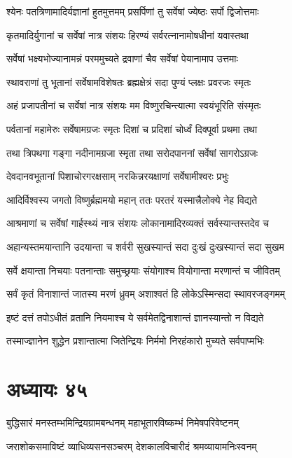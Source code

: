 \twolineshloka
{श्येनः पतत्रिणामादिर्यज्ञानां हुतमुत्तमम्}
{प्रसर्पिणां तु सर्वेषां ज्येष्ठः सर्पो द्विजोत्तमाः}


\twolineshloka
{कृतमादिर्युगानां च सर्वेषां नात्र संशयः}
{हिरण्यं सर्वरत्नानामोषधीनां यवास्तथा}


\twolineshloka
{सर्वेषां भक्ष्यभोज्यानामन्नं परममुच्यते}
{द्रवाणां चैव सर्वेषां पेयानामाप उत्तमाः}


\twolineshloka
{स्थावराणां तु भूतानां सर्वेषामविशेषतः}
{ब्रह्मक्षेत्रं सदा पुण्यं प्लक्षः प्रवरजः स्मृतः}


\twolineshloka
{अहं प्रजापतीनां च सर्वेषां नात्र संशयः}
{मम विष्णुरचिन्त्यात्मा स्वयंभूरिति संस्मृतः}


\twolineshloka
{पर्वतानां महामेरुः सर्वेषामग्रजः स्मृतः}
{दिशां च प्रदिशां चोर्ध्वं दिक्पूर्वा प्रथमा तथा}


\twolineshloka
{तथा त्रिपथगा गङ्गा नदीनामग्रजा स्मृता}
{तथा सरोदपाननां सर्वेषां सागरोऽग्रजः}


\twolineshloka
{देवदानवभूतानां पिशाचोरगरक्षसाम्}
{नरकिन्नरयक्षाणां सर्वेषामीश्वरः प्रभुः}


\twolineshloka
{आदिर्विश्वस्य जगतो विष्णुर्ब्रह्ममयो महान्}
{ततः परतरं यस्मात्त्रैलोक्ये नेह विद्यते}


\twolineshloka
{आश्रमाणां च सर्वेषां गार्हस्थ्यं नात्र संशयः}
{लोकानामादिरव्यक्तं सर्वस्यान्तस्तदेव च}


\twolineshloka
{अहान्यस्तमयान्तानि उदयान्ता च शर्वरी}
{सुखस्यान्तं सदा दुःखं दुःखस्यान्तं सदा सुखम}


\twolineshloka
{सर्वे क्षयान्ता निचयाः पतनान्ताः समुच्छ्रयाः}
{संयोगाश्च वियोगान्ता मरणान्तं च जीवितम्}


\twolineshloka
{सर्वं कृतं विनाशान्तं जातस्य मरणं ध्रुवम्}
{अशाश्वतं हि लोकेऽस्मिन्सदा स्थावरजङ्गमम्}


\twolineshloka
{इष्टं दत्तं तपोऽधीतं व्रतानि नियमाश्च ये}
{सर्वमेतद्विनाशान्तं ज्ञानस्यान्तो न विद्यते}


\twolineshloka
{तस्माज्ज्ञानेन शुद्धेन प्रशान्तात्मा जितेन्द्रियः}
{निर्ममो निरहंकारो मुच्यते सर्वपाप्मभिः}


\chapter{अध्यायः ४५}
\twolineshloka
{बुद्धिसारं मनस्तम्भमिन्द्रियग्रामबन्धनम्}
{महाभूतारविष्कम्भं निमेषपरिवेष्टनम्}


\twolineshloka
{जराशोकसमाविष्टं व्याधिव्यसनसञ्चरम्}
{देशकालविचारीदं श्रमव्यायामनिःस्वनम्}


